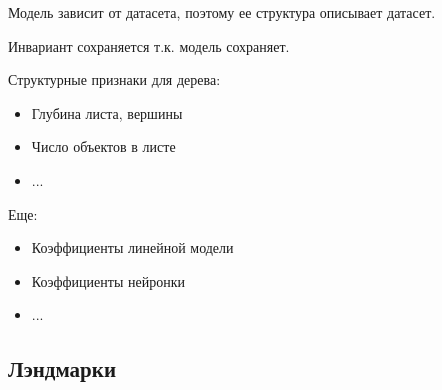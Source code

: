 Модель зависит от датасета, поэтому ее структура описывает
датасет.

Инвариант сохраняется т.к. модель сохраняет.

Структурные признаки для дерева:
\begin{itemize}
    \item Глубина листа, вершины
    \item Число объектов в листе
    \item ...
\end{itemize}

Еще:
\begin{itemize}
    \item Коэффициенты линейной модели
    \item Коэффициенты нейронки
    \item ...
\end{itemize}

\subsection*{Лэндмарки}

